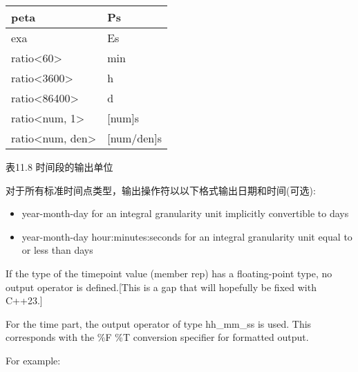 \begin{longtable}[c]{|l|l|}
peta                                   & Ps                     \\ \hline
exa                                    & Es                     \\ \hline
ratio\textless{}60\textgreater{}       & min                    \\ \hline
ratio\textless{}3600\textgreater{}     & h                      \\ \hline
ratio\textless{}86400\textgreater{}    & d                      \\ \hline
ratio\textless{}num, 1\textgreater{}   & {[}num{]}s             \\ \hline
ratio\textless{}num, den\textgreater{} & {[}num/den{]}s         \\ \hline
\end{longtable}

\begin{center}
表11.8 时间段的输出单位
\end{center}

对于所有标准时间点类型，输出操作符以以下格式输出日期和时间(可选):

\begin{itemize}
\item 
year-month-day for an integral granularity unit implicitly convertible to days

\item 
year-month-day hour:minutes:seconds for an integral granularity unit equal to or less than days
\end{itemize}

If the type of the timepoint value (member rep) has a floating-point type, no output operator is defined.[This is a gap that will hopefully be fixed with C++23.]

For the time part, the output operator of type hh\_mm\_ss is used. This corresponds with the \%F \%T conversion specifier for formatted output.

For example:


